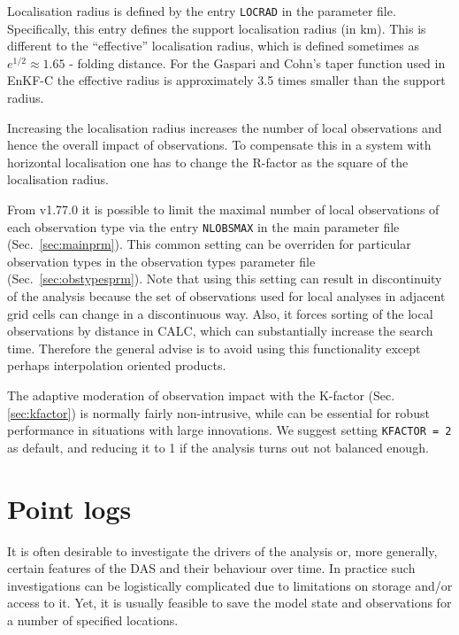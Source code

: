 \documentclass[11pt]{report}
\begin{document}
Localisation radius is defined by the entry \verb|LOCRAD| in the parameter file.
Specifically, this entry defines the support localisation radius (in km).
This is different to the ``effective'' localisation radius, which is defined sometimes as $e^{1/2}\approx 1.65$ - folding distance.
For the Gaspari and Cohn's taper function used in EnKF-C the effective radius is approximately 3.5 times smaller than the support radius.

Increasing the localisation radius increases the number of local observations and hence the overall impact of observations.
To compensate this in a system with horizontal localisation one has to change the R-factor as the square of the localisation radius.

From v1.77.0 it is possible to limit the maximal number of local observations of each observation type via the entry \verb|NLOBSMAX| in the main parameter file (Sec.~\ref{sec:mainprm}).
This common setting can be overriden for particular observation types in the observation types parameter file (Sec.~\ref{sec:obstypesprm}).
Note that using this setting can result in discontinuity of the analysis because the set of observations used for local analyses in adjacent grid cells can change in a discontinuous way.
Also, it forces sorting of the local observations by distance in CALC, which can substantially increase the search time.
Therefore the general advise is to avoid using this functionality except perhaps interpolation oriented products.

The adaptive moderation of observation impact with the K-factor (Sec. \ref{sec:kfactor}) is normally fairly non-intrusive, while can be essential for robust performance in situations with large innovations.
We suggest setting \verb|KFACTOR = 2| as default, and reducing it to 1 if the analysis turns out not balanced enough.

\section{Point logs}
\label{sec:pointlogs}

It is often desirable to investigate the drivers of the analysis or, more generally, certain features of the DAS and their behaviour over time.
In practice such investigations can be logistically complicated due to limitations on storage and/or access to it.
Yet, it is usually feasible to save the model state and observations for a number of specified locations.
\end{document}
